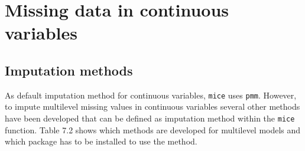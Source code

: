 \documentclass[
]{book}
\begin{document}
\hypertarget{missing-data-in-continuous-variables}{%
\section{Missing data in continuous variables}\label{missing-data-in-continuous-variables}}

\hypertarget{imputation-methods}{%
\subsection{Imputation methods}\label{imputation-methods}}

As default imputation method for continuous variables, \texttt{mice} uses \texttt{pmm}. However, to impute multilevel missing values in continuous variables several other methods have been developed that can be defined as imputation method within the \texttt{mice} function. Table 7.2 shows which methods are developed for multilevel models and which package has to be installed to use the method.
\end{document}
